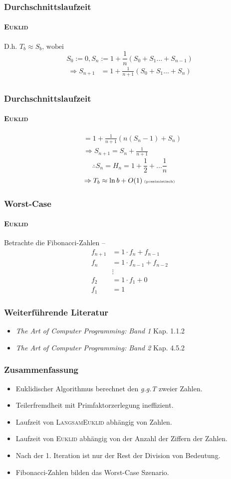 \documentclass[•]{beamer}
\begin{document}
\begin{frame}
\frametitle{Durchschnittslaufzeit}
	\framesubtitle{\textsc{Euklid}}
	
	$ \text{D.h. }T_b \approx S_b \text{, wobei }$ $$S_0 := 0, S_n := 1 + \frac{1}{n} (S_0 + S_1 \dots + S_{n-1})$$
	\begin{align*}
	\Rightarrow S_{n+1} &= 1 + \frac{1}{n+1}(S_0 + S_1 \dots + S_n)\\
	\end{align*}
	
\end{frame}

\begin{frame}
\frametitle{Durchschnittslaufzeit}
	\framesubtitle{\textsc{Euklid}}
\begin{align*}
&= 1 + \frac{1}{n+1}(n(S_n - 1) + S_n)\\
	&\Rightarrow S_{n+1}= S_n + \frac{1}{n+1}
\end{align*}
$$\therefore S_n = H_n = 1 + \frac{1}{2} + \dots \frac{1}{n}$$ $$ \Rightarrow T_b \approx \ln b + O(1)\text{\tiny{ (pessimistisch)}}$$

\end{frame}
	
	\begin{frame}
	\frametitle{Worst-Case}
	\framesubtitle{\textsc{Euklid}}

	Betrachte die Fibonacci-Zahlen --
	\begin{align*}
 f_{n+1} &= 1 \cdot f_{n} + f_{n-1} \\
 f_{n} &= 1 \cdot f_{n-1} + f_{n-2} \\
 &\vdots \\
 f_{2} &= 1 \cdot f_{1} + 0 \\
 f_{1} &= 1
\end{align*}
\end{frame}	

\begin{frame}
\frametitle{Weiterf\"uhrende Literatur}
\begin{itemize}
\item \textit{The Art of Computer Programming: Band 1} Kap. 1.1.2
\item \textit{The Art of Computer Programming: Band 2} Kap. 4.5.2
\end{itemize}
\end{frame}

\begin{frame}
\frametitle{Zusammenfassung}
\begin{itemize}
\item Euklidischer Algorithmus berechnet den \textit{g.g.T} zweier Zahlen.
\item Teilerfremdheit mit Primfaktorzerlegung ineffizient.
\item Laufzeit von \textsc{LangsamEuklid} abh\"angig von Zahlen.
\item Laufzeit von \textsc{Euklid} abh\"angig von der Anzahl der Ziffern der Zahlen.
\item Nach der 1. Iteration ist nur der Rest der Division von Bedeutung.
\item Fibonacci-Zahlen bilden das Worst-Case Szenario.
\end{itemize}
\end{frame}
\end{document}
